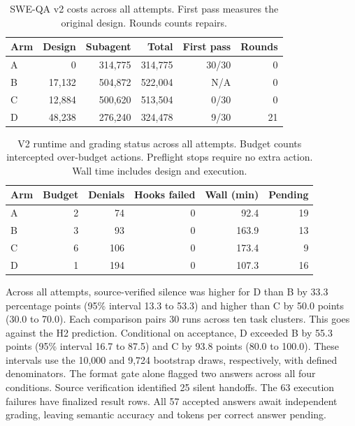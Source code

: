 \documentclass[sigconf,nonacm]{acmart}
\begin{document}
\begin{table}[t]
\caption{SWE-QA v2 costs across all attempts. First pass measures the original design. Rounds counts repairs.}
\centering
\setlength{\tabcolsep}{3pt}
\begin{tabular}{lrrrrr}
\toprule
Arm & Design & Subagent & Total & First pass & Rounds \\
\midrule
A & 0 & 314,775 & 314,775 & 30/30 & 0 \\
B & 17,132 & 504,872 & 522,004 & N/A & 0 \\
C & 12,884 & 500,620 & 513,504 & 0/30 & 0 \\
D & 48,238 & 276,240 & 324,478 & 9/30 & 21 \\
\bottomrule
\end{tabular}
\end{table}

\begin{table}[t]
\caption{V2 runtime and grading status across all attempts. Budget counts intercepted over-budget actions. Preflight stops require no extra action. Wall time includes design and execution.}
\centering
\setlength{\tabcolsep}{3pt}
\begin{tabular}{lrrrrr}
\toprule
Arm & Budget & Denials & Hooks failed & Wall (min) & Pending \\
\midrule
A & 2 & 74 & 0 & 92.4 & 19 \\
B & 3 & 93 & 0 & 163.9 & 13 \\
C & 6 & 106 & 0 & 173.4 & 9 \\
D & 1 & 194 & 0 & 107.3 & 16 \\
\bottomrule
\end{tabular}
\end{table}

Across all attempts, source-verified silence was higher for D than B by
33.3 percentage points (95\% interval 13.3 to 53.3) and higher than C
by 50.0 points (30.0 to 70.0). Each comparison pairs 30 runs across
ten task clusters. This goes against the H2 prediction. Conditional on
acceptance, D exceeded B by 55.3 points (95\% interval 16.7 to 87.5)
and C by 93.8 points (80.0 to 100.0). These intervals use the 10,000
and 9,724 bootstrap draws, respectively, with defined denominators.
The format gate alone flagged two answers across all four conditions.
Source verification identified 25 silent handoffs.
The 63 execution failures have finalized result rows. All 57 accepted
answers await independent grading, leaving semantic accuracy and tokens
per correct answer pending.
\end{document}
